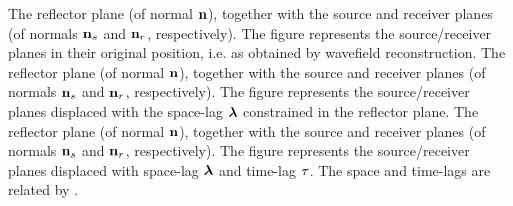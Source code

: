 
 {The reflector plane (of normal
  $\nn$), together with the source and receiver planes (of normals
  $\ns$ and $\nr$, respectively). The figure represents the
  source/receiver planes in their original position, i.e. as obtained
  by wavefield reconstruction. }
 {The reflector plane (of
  normal $\nn$), together with the source and receiver planes (of
  normals $\ns$ and $\nr$, respectively). The figure represents the
  source/receiver planes displaced with the space-lag $\hh$
  constrained in the reflector plane.}
 {The reflector plane (of
  normal $\nn$), together with the source and receiver planes (of
  normals $\ns$ and $\nr$, respectively). The figure represents the
  source/receiver planes displaced with space-lag $\hh$ and time-lag
  $\tt$.  The space and time-lags are related by .}
